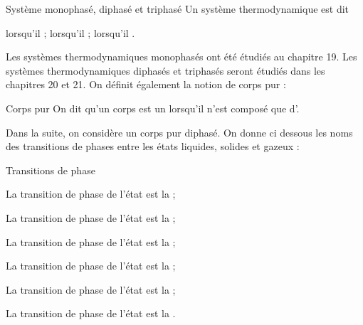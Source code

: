 \documentclass[a4paper,french,bookmarks]{article}
\begin{document}
\begin{definition}{Système monophasé, diphasé et triphasé}{}
    Un système thermodynamique est dit
    \begin{enumerate}
        \ithand {} lorsqu'il  ;
        \ithand {} lorsqu'il  ;
        \ithand {} lorsqu'il .
    \end{enumerate}
\end{definition}

Les systèmes thermodynamiques monophasés ont été étudiés au chapitre 19. Les systèmes thermodynamiques diphasés et triphasés seront étudiés dans les chapitres 20 et 21. On définit également la notion de corps pur :

\begin{definition}{Corps pur}{}
    On dit qu'un corps est un  lorsqu'il n'est composé que d'.
\end{definition}

Dans la suite, on considère un corps pur diphasé. On donne ci dessous les noms des transitions de phases entre les états liquides, solides et gazeux :

\begin{definition}{Transitions de phase}{}
    \begin{enumerate}
        \ithand La transition de phase de l'état  est la  ;
        
        \ithand La transition de phase de l'état  est la  ;
        
        \ithand La transition de phase de l'état  est la  ;
        
        \ithand La transition de phase de l'état  est la  ;
        
        \ithand La transition de phase de l'état  est la  ;
        
        \ithand La transition de phase de l'état  est la .
    \end{enumerate}
\end{definition}
\end{document}
